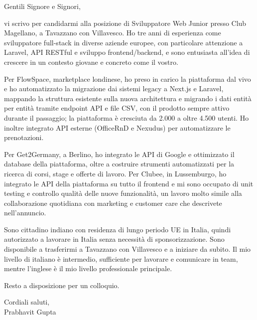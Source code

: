 \documentclass[a4paper,11pt]{article}
\begin{document}
Gentili Signore e Signori,

vi scrivo per candidarmi alla posizione di Sviluppatore Web Junior presso Club Magellano, a Tavazzano con Villavesco. Ho tre anni di esperienza come sviluppatore full-stack in diverse aziende europee, con particolare attenzione a Laravel, API RESTful e sviluppo frontend/backend, e sono entusiasta all'idea di crescere in un contesto giovane e concreto come il vostro.

Per FlowSpace, marketplace londinese, ho preso in carico la piattaforma dal vivo e ho automatizzato la migrazione dai sistemi legacy a Next.js e Laravel, mappando la struttura esistente sulla nuova architettura e migrando i dati entità per entità tramite endpoint API e file CSV, con il prodotto sempre attivo durante il passaggio; la piattaforma è cresciuta da 2.000 a oltre 4.500 utenti. Ho inoltre integrato API esterne (OfficeRnD e Nexudus) per automatizzare le prenotazioni.

Per Get2Germany, a Berlino, ho integrato le API di Google e ottimizzato il database della piattaforma, oltre a costruire strumenti automatizzati per la ricerca di corsi, stage e offerte di lavoro. Per Clubee, in Lussemburgo, ho integrato le API della piattaforma su tutto il frontend e mi sono occupato di unit testing e controllo qualità delle nuove funzionalità, un lavoro molto simile alla collaborazione quotidiana con marketing e customer care che descrivete nell'annuncio.

Sono cittadino indiano con residenza di lungo periodo UE in Italia, quindi autorizzato a lavorare in Italia senza necessità di sponsorizzazione. Sono disponibile a trasferirmi a Tavazzano con Villavesco e a iniziare da subito. Il mio livello di italiano è intermedio, sufficiente per lavorare e comunicare in team, mentre l'inglese è il mio livello professionale principale.

Resto a disposizione per un colloquio.

Cordiali saluti,\\
Prabhavit Gupta
\end{document}
